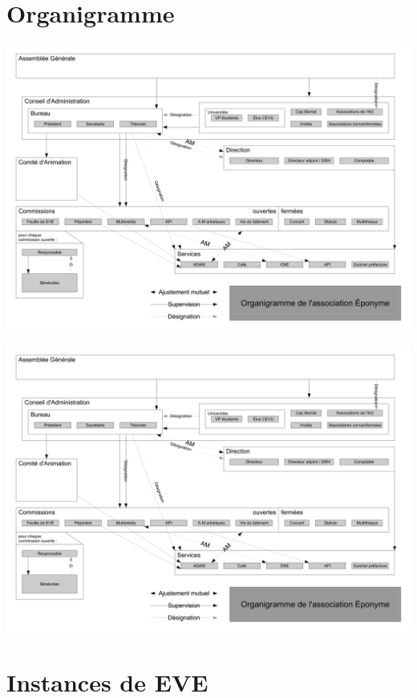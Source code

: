 \section{Organigramme}
\label{organigramme}
\newpage

\begin{flushright}
\includegraphics[trim=0mm 0mm 210mm 0mm,clip,scale=0.7]{annexes/organigramme.pdf}
\end{flushright}
\newpage
\begin{flushleft}
\includegraphics[trim=210mm 0mm 0mm 0mm,clip,scale=0.7]{annexes/organigramme.pdf}
\end{flushleft}
\newpage

\section{Instances de EVE}

